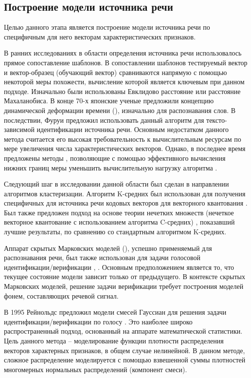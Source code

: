 \subsection{Построение модели источника речи}

Целью данного этапа является построение модели источника речи по специфичным для него векторам характеристических признаков.

В ранних исследованиях в области определения источника речи использовалось прямое сопоставление шаблонов. В сопоставлении шаблонов тестируемый вектор и вектор-образец (обучающий вектор) сравниваются напрямую с помощью некоторой меры похожести, вычисление которой является ключевым при данном подходе. Изначально были использованы Евклидово расстояние или расстояние Махаланобиса. В конце 70-х японские ученые предложили \cite{Sakoe78DTW} концепцию динамической деформации времени (), изначально для распознавания слов. В последствии, Фуруи \cite{Furui81cepstral} предложил использовать данный алгоритм для тексто-зависимой идентификации источника речи. Основным недостатком данного метода считается его высокая требовательность к вычислительным ресурсам по мере увеличения числа характеристических векторов. Однако, в последнее время предложены методы \cite{Lemire09dtw}, позволяющие с помощью эффективного вычисления нижних границ меры уменьшить вычислительную нагрузку алгоритма .

Следующий шаг в исследовании данной области был сделан в направлении алгоритмов кластеризации. Алгоритм K-средних был использован для получения специфичных для источника речи кодовых векторов для векторного квантования \cite{Soong85VQ}. Был также предложен подход на основе теории нечетких множеств (нечеткое векторное квантование с использованием алгоритма C-средних) \cite{Bezdek78FVQ}, показавший лучшие результаты, по сравнению со стандартным алгоритмом K-средних.

Аппарат скрытых Марковских моделей (), успешно применяемый для распознавания речи, был также использован для задачи голосовой идентификации/верификации \cite{Olsson02hmmann}, \cite{Falavigna_comparisonof}. Основным предположением является то, что текущее состояние модели зависит только от предыдущего. В контексте скрытых Марковских моделей, решение задачи верификации требует построения моделей фонем, составляющих речевой сигнал.

В 1995 Рейнольдс предложил модели смесей Гауссиан для решения задачи идентификации/верификации по голосу \cite{Reynolds95gmm}. Это наиболее широко распространенный подход, основанный на аппарате математической статистики. Цель данного метода -- моделирование функции плотности распределения векторов характерных признаков, в общем случае нелинейной. В данном методе, сложное распределение моделируется с помощью взвешенной суммы плотностей многомерных нормальных распределений (компонент смеси).

